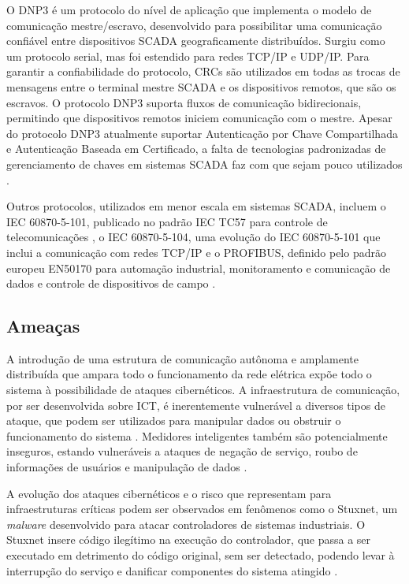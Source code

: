 \documentclass[cic,tc]{iiufrgs}
\begin{document}
O DNP3 é um protocolo do nível de aplicação que implementa o modelo de comunicação mestre/escravo, desenvolvido para possibilitar uma comunicação confiável entre dispositivos SCADA geograficamente distribuídos. Surgiu como um protocolo serial, mas foi estendido para redes TCP/IP e UDP/IP. Para garantir a confiabilidade do protocolo, CRCs são utilizados em todas as trocas de mensagens entre o terminal mestre SCADA e os dispositivos remotos, que são os escravos. O protocolo DNP3 suporta fluxos de comunicação bidirecionais, permitindo que dispositivos remotos iniciem comunicação com o mestre. Apesar do protocolo DNP3 atualmente suportar Autenticação por Chave Compartilhada e Autenticação Baseada em Certificado, a falta de tecnologias padronizadas de gerenciamento de chaves em sistemas SCADA faz com que sejam pouco utilizados \cite{drias2015taxonomy}.

Outros protocolos, utilizados em menor escala em sistemas SCADA, incluem o IEC 60870-5-101, publicado no padrão IEC TC57 para controle de telecomunicações \cite{liguo2010iec}, o IEC 60870-5-104, uma evolução do IEC 60870-5-101 que inclui a comunicação com redes TCP/IP \cite{yang2014stateful} e o PROFIBUS, definido pelo padrão europeu EN50170 para automação industrial, monitoramento e comunicação de dados e controle de dispositivos de campo \cite{chen2011realtime}.

\subsection{Ameaças}
\label{subsecthreats}
A introdução de uma estrutura de comunicação autônoma e amplamente distribuída que ampara todo o funcionamento da rede elétrica expõe todo o sistema à possibilidade de ataques cibernéticos. A infraestrutura de comunicação, por ser desenvolvida sobre ICT, é inerentemente vulnerável a diversos tipos de ataque, que podem ser utilizados para manipular dados ou obstruir o funcionamento do sistema \cite{pin2012smart}. Medidores inteligentes também são potencialmente inseguros, estando vulneráveis a ataques de negação de serviço, roubo de informações de usuários e manipulação de dados \cite{ashford2011smartmeter}.

A evolução dos ataques cibernéticos e o risco que representam para infraestruturas críticas podem ser observados em fenômenos como o Stuxnet, um \textit{malware} desenvolvido para atacar controladores de sistemas industriais. O Stuxnet insere código ilegítimo na execução do controlador, que passa a ser executado em detrimento do código original, sem ser detectado, podendo levar à interrupção do serviço e danificar componentes do sistema atingido \cite{langner2011stuxnet}.
\end{document}
